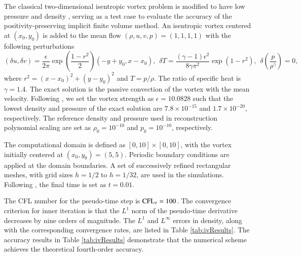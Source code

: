 The classical two-dimensional isentropic vortex problem \cite{hu1999weighted_WENO}
is modified to have low pressure and density \cite{zhang2012positivity}, serving as a test case to evaluate the accuracy of the positivity-preserving implicit finite volume method.
An isentropic vortex centered at $(x_0,y_0)$ is added to the mean flow $(\rho, u, v, p)=(1,1,1,1)$ with the following perturbations
\begin{equation}
    (\delta u, \delta v) = \frac{\epsilon}{2\pi} \exp(\frac{1-r^2}{2}) (-y+y_0, x-x_0),\ \
    \delta T = \frac{(\gamma-1)\epsilon^2}{8\gamma \pi^2}\exp(1-r^2), \ \ \delta\left(\frac{p}{\rho^\gamma}\right)=0, 
\end{equation}
where $r^2=(x-x_0)^2+(y-y_0)^2$ and $T= p/\rho$. 
The ratio of specific heat is $\gamma=1.4$. 
The exact solution is the passive convection of the vortex with the mean velocity. 
Following \cite{zhang2012positivity}, we set the vortex strength as $\epsilon = 10.0828$ 
such that the lowest density and pressure of the exact solution are 
$7.8 \times 10^{-15}$ and $1.7 \times 10^{-20}$, respectively.
The reference density and pressure used in reconstruction polynomial scaling are 
set as $\rho_0 = 10^{-10}$ and $p_0=10^{-10}$, respectively. 

The computational domain is defined as $[0,10]\times[0,10]$, with the vortex initially centered at $(x_0,y_0)=(5,5)$. Periodic boundary conditions are applied at the domain boundaries.  A set of successively refined rectangular meshes, with grid sizes $h=1/2$ to $h=1/32$, are used in the simulations. Following \cite{zhang2012positivity}, the final time is set as $t=0.01$. 

The CFL number for the pseudo-time step is $\text{CFL}_\tau = 100$. 
The convergence criterion for inner iteration is that the $L^1$ norm of the pseudo-time derivative 
decreases by nine orders of magnitude.
The $L^1$ and $L^\infty$ errors in density, 
along with the corresponding convergence rates, 
are listed in Table \ref{tab:ivResults}. 
The accuracy results in Table \ref{tab:ivResults} demonstrate that the numerical scheme achieves the theoretical fourth-order accuracy.


